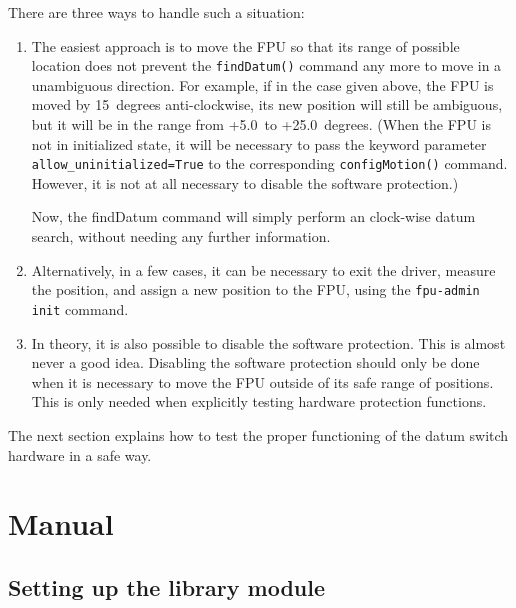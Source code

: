 \documentclass[fontsize=12,a4paper]{scrreprt}
\begin{document}
There are three ways to handle such a situation:

\begin{enumerate}
\item The easiest approach is to move the FPU so that its range of
  possible location does not prevent the \texttt{findDatum()} command
  any more to move in a unambiguous direction. For example, if in the
  case given above, the FPU is moved by 15\degree\ degrees anti-clockwise, its
  new position will still be ambiguous, but it will be in the range
  from +5.0\degree\ to +25.0\degree\ degrees. (When the FPU is not in initialized
  state, it will be necessary to pass the keyword parameter
  \texttt{allow\_uninitialized=True} to the corresponding
  \texttt{configMotion()} command. However, it is not at all necessary
  to disable the software protection.)

  Now, the findDatum command will simply perform an clock-wise datum
  search, without needing any further information.

\item Alternatively, in a few cases, it can be necessary to exit the
  driver, measure the position, and assign a new position to the FPU,
  using the \texttt{fpu-admin init} command.

\item In theory, it is also possible to disable the software
  protection.  This is almost never a good idea. Disabling the
  software protection should only be done when it is necessary to move
  the FPU outside of its safe range of positions. This is only needed
  when explicitly testing hardware protection functions.
\end{enumerate}

The next section explains how to test the proper functioning of the
datum switch hardware in a safe way.


\part{Manual}

\chapter{Setting up the library module}
\label{sec:settingup}

\minitoc
\end{document}
